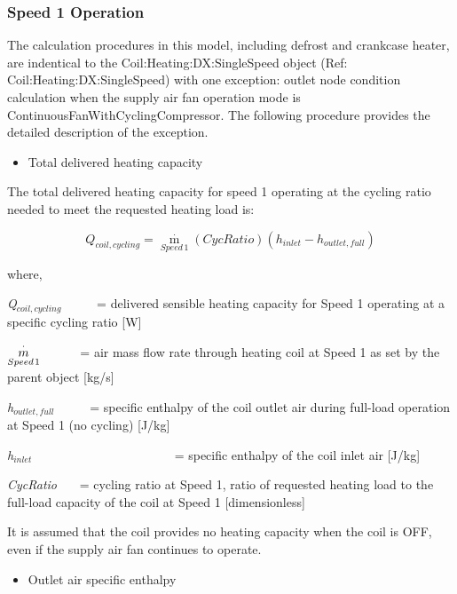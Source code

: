 \subsubsection{Speed 1 Operation}\label{speed-1-operation-1}

The calculation procedures in this model, including defrost and crankcase heater, are indentical to the Coil:Heating:DX:SingleSpeed object (Ref: Coil:Heating:DX:SingleSpeed) with one exception: outlet node condition calculation when the supply air fan operation mode is ContinuousFanWithCyclingCompressor. The following procedure provides the detailed description of the exception.

\begin{itemize}
  \item Total delivered heating capacity
\end{itemize}

The total delivered heating capacity for speed 1 operating at the cycling ratio needed to meet the requested heating load is:

\begin{equation}
{Q_{coil,cycling}} = {\mathop m\limits^\cdot_{Speed\,1}}\left( {CycRatio} \right)({h_{inlet}} - {h_{outlet,full}})
\end{equation}

where,

\emph{Q\(_{coil,cycling}\)}~~~~~ = delivered sensible heating capacity for Speed 1 operating at a specific cycling ratio {[}W{]}

\(\mathop {{\rm{ }}m}\limits_{Speed{\kern 1pt} 1}^ \cdot\) ~~~~~ = air mass flow rate through heating coil at Speed 1 as set by the parent object {[}kg/s{]}

\emph{h\(_{outlet,full}\)}~~~~~ = specific enthalpy of the coil outlet air during full-load operation at Speed 1 (no cycling) {[}J/kg{]}

\emph{h\(_{inlet}\)~~~~~~~~~~~}~~~~~~~~~~~ = specific enthalpy of the coil inlet air {[}J/kg{]}

\emph{CycRatio}~~~ = cycling ratio at Speed 1, ratio of requested heating load to the full-load capacity of the coil at Speed 1 {[}dimensionless{]}

It is assumed that the coil provides no heating capacity when the coil is OFF, even if the supply air fan continues to operate.

\begin{itemize}
  \item Outlet air specific enthalpy
\end{itemize}


